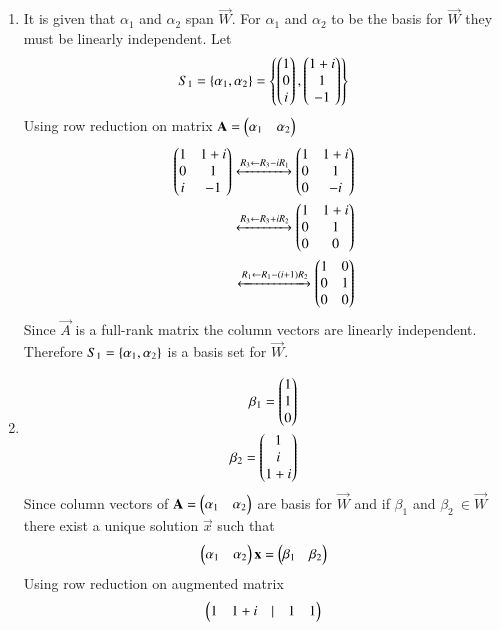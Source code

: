 \begin{enumerate}[label=\emph{\alph*)}]
\item 
It is given that $\alpha_1$ and $\alpha_2$ span $\vec{W}$. For $\alpha_1$ and
$\alpha_2$ to be the basis for $\vec{W}$ they must be linearly independent.
Let
\begin{align}
	S_1=\left\{\alpha_1,\alpha_2\right\}=\left\{\begin{pmatrix}1\\0\\i\end{pmatrix},\begin{pmatrix}1+i\\1\\-1\end{pmatrix}\right\}
\end{align}
Using row reduction on matrix $\mathbf{A}=\begin{pmatrix}\alpha_1 & \alpha_2\end{pmatrix}$
\begin{align}
	\begin{pmatrix}1 & 1+i \\ 0 & 1 \\ i & -1\end{pmatrix}
	\xleftrightarrow[]{R_3 \leftarrow R_3-iR_1}
	\begin{pmatrix}1 & 1+i \\ 0 & 1 \\ 0 & -i\end{pmatrix}\\   
	\xleftrightarrow[]{R_3 \leftarrow R_3+iR_2}
	\begin{pmatrix}1 & 1+i \\ 0 & 1 \\ 0 & 0\end{pmatrix}\\
	\xleftrightarrow[]{R_1 \leftarrow R_1 - (i+1)R_2}
	 \begin{pmatrix}1 & 0 \\ 0 & 1 \\ 0 & 0\end{pmatrix} \label{eq:solutions/2/4/4/rrefA}
\end{align}
Since $\vec{A}$ is a full-rank matrix the column vectors are linearly 
independent. Therefore $S_1= \left\{ \alpha_1, \alpha_2 \right\} $ is a basis set for 
$\vec{W}$.
\item
\begin{align}
	\beta_1=\begin{pmatrix}1\\1\\0\end{pmatrix} \\
	\beta_2=\begin{pmatrix}1\\i\\1+i\end{pmatrix} 
\end{align}
		Since column vectors of $\mathbf{A}=\begin{pmatrix}\alpha_1 & \alpha_2\end{pmatrix}$ are basis for $\vec{W}$ and if $\beta_1$ and $\beta_2 \ \in \vec{W}$ there exist a unique solution $\vec{x}$ such that
\begin{align}
	\begin{pmatrix}\alpha_1 & \alpha_2\end{pmatrix}\mathbf{x}=\begin{pmatrix}\beta_1 & \beta_2\end{pmatrix} 
\end{align}
Using row reduction on augmented matrix
		\begin{align}
			\begin{pmatrix}1 & 1+i & | & 1 & 1\\
\end{pmatrix}
\end{align}
\end{enumerate}
